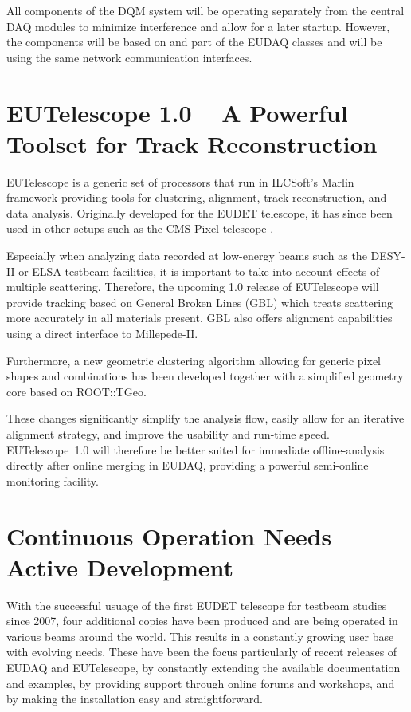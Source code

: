 \documentclass[paper=a4, fontsize=11pt, titlepage]{scrartcl}	%
\numberwithin{equation}{section}		%
\numberwithin{figure}{section}			%
\numberwithin{table}{section}           	%
\begin{document}
All components of the DQM system will be operating separately from the
central DAQ modules to minimize interference and allow for a later
startup. However, the components will be based on and part of the
EUDAQ classes and will be using the same network communication interfaces.


\section{EUTelescope 1.0 -- A Powerful Toolset for Track Reconstruction }
\label{sec:analysis}

EUTelescope is a generic set of processors that run in ILCSoft's Marlin
framework providing tools for clustering, alignment, track
reconstruction, and data analysis. Originally developed for the EUDET
telescope, it has since been used in other setups such as
the CMS Pixel telescope \cite{spannagel2012}.

Especially when analyzing data recorded at low-energy beams such as
the DESY-II or ELSA testbeam facilities, it is important to take into
account effects of multiple scattering. Therefore, the upcoming 1.0
release of EUTelescope will provide tracking based on {General Broken
  Lines (GBL)} \cite{Kleinwort:2012np} which treats scattering more
accurately in all materials present.  GBL also offers alignment
capabilities using a direct interface to {Millepede-II}.

Furthermore, a new {geometric clustering algorithm} allowing for generic
pixel shapes and combinations has been developed together with a
simplified geometry core based on ROOT::TGeo.

These changes significantly simplify the analysis flow, easily allow for
an iterative alignment strategy, and improve the usability and
run-time speed. EUTelescope~1.0 will therefore be better suited for
immediate offline-analysis directly after online merging in EUDAQ,
providing a powerful semi-online monitoring facility.

\section{Continuous Operation Needs Active Development}

With the successful usuage of the first EUDET telescope for testbeam studies since
2007, four additional copies have been produced and are being operated in
various beams around the world. This results in a constantly growing user base
with evolving needs.
These have been the focus particularly of recent releases of EUDAQ and
EUTelescope, by constantly extending the available documentation and
examples, by providing support through online forums and
workshops, and by making the installation easy and straightforward.
\end{document}

